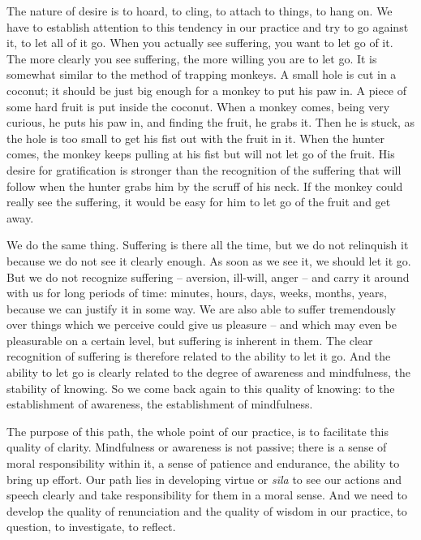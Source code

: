 The nature of desire is to hoard, to cling, to attach to things, to hang
on. We have to establish attention to this tendency in our practice and
try to go against it, to let all of it go. When you actually see
suffering, you want to let go of it. The more clearly you see suffering, 
the more willing you are to let go. It is somewhat similar to the method
of trapping monkeys. A small hole is cut in a coconut; it should be just
big enough for a monkey to put his paw in. A piece of some hard fruit is
put inside the coconut. When a monkey comes, being very curious, he puts
his paw in, and finding the fruit, he grabs it. Then he is stuck, as the
hole is too small to get his fist out with the fruit in it. When the
hunter comes, the monkey keeps pulling at his fist but will not let go
of the fruit. His desire for gratification is stronger than the
recognition of the suffering that will follow when the hunter grabs him
by the scruff of his neck. If the monkey could really see the suffering, 
it would be easy for him to let go of the fruit and get away. 

We do the same thing. Suffering is there all the time, but we do not
relinquish it because we do not see it clearly enough. As soon as we see
it, we should let it go. But we do not recognize suffering -- aversion, 
ill-will, anger -- and carry it around with us for long periods of
time: minutes, hours, days, weeks, months, years, because we can justify
it in some way. We are also able to suffer tremendously over things
which we perceive could give us pleasure -- and which may even be
pleasurable on a certain level, but suffering is inherent in them. The
clear recognition of suffering is therefore related to the ability to
let it go. And the ability to let go is clearly related to the degree of
awareness and mindfulness, the stability of knowing. So we come back
again to this quality of knowing: to the establishment of awareness, the
establishment of mindfulness. 

The purpose of this path, the whole point of our practice, is to
facilitate this quality of clarity. Mindfulness or awareness is not
passive; there is a sense of moral responsibility within it, a sense of
patience and endurance, the ability to bring up effort. Our path lies in
developing virtue or \emph{sīla} to see our actions and speech clearly
and take responsibility for them in a moral sense. And we need to
develop the quality of renunciation and the quality of wisdom in our
practice, to question, to investigate, to reflect. 

